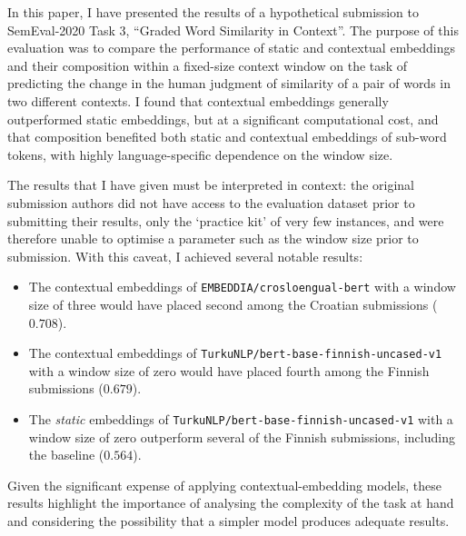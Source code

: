 In this paper, I have presented the results of a hypothetical submission to SemEval-2020
Task 3, ``Graded Word Similarity in Context''.
The purpose of this evaluation was to compare the performance of static and contextual
embeddings and their composition within a fixed-size context window on the task of
predicting the change in the human judgment of similarity of a pair of words in two
different contexts.
I found that contextual embeddings generally outperformed static embeddings, but at a
significant computational cost, and that composition benefited both static and
contextual embeddings of sub-word tokens, with highly language-specific dependence
on the window size.

The results that I have given must be interpreted in context: the original submission
authors did not have access to the evaluation dataset prior to submitting their results,
only the `practice kit' of very few instances, and were therefore unable to optimise a
parameter such as the window size prior to submission.
With this caveat, I achieved several notable results:
\begin{itemize}
  \item The contextual embeddings of \texttt{EMBEDDIA/crosloengual-bert} with a window
        size of three would have placed second among the Croatian submissions
        ($0.708$).
  \item The contextual embeddings of \texttt{TurkuNLP/bert-base-finnish-uncased-v1} with
        a window size of zero would have placed fourth among the Finnish submissions
        ($0.679$).
  \item The \emph{static} embeddings of \texttt{TurkuNLP/bert-base-finnish-uncased-v1}
        with a window size of zero outperform several of the Finnish submissions,
        including the baseline ($0.564$).
\end{itemize}
Given the significant expense of applying contextual-embedding models, these results
highlight the importance of analysing the complexity of the task at hand and considering
the possibility that a simpler model produces adequate results.